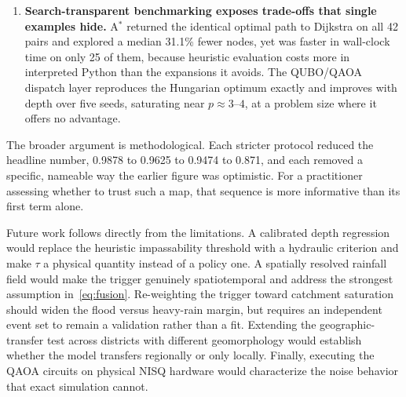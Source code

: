 \documentclass[10pt,twocolumn]{article}
\begin{document}
\begin{enumerate}
      pairs at $\tau\ge0.65$, $0.55$--$0.60$ and $\le0.50$. $\tau$ should be set
      by policy on acceptable risk, not by convention.
\item \textbf{Search-transparent benchmarking exposes trade-offs that single
      examples hide.} A$^\ast$ returned the identical optimal path to Dijkstra on
      all 42 pairs and explored a median 31.1\% fewer nodes, yet was faster in
      wall-clock time on only 25 of them, because heuristic evaluation costs more
      in interpreted Python than the expansions it avoids. The QUBO/QAOA dispatch
      layer reproduces the Hungarian optimum exactly and improves with depth
      over five seeds, saturating near $p\approx3$--$4$, at a problem size where
      it offers no advantage.
\end{enumerate}

The broader argument is methodological. Each stricter protocol reduced the
headline number, 0.9878 to 0.9625 to 0.9474 to 0.871, and each removed a specific,
nameable way the earlier figure was optimistic. For a practitioner assessing
whether to trust such a map, that sequence is more informative than its first term
alone.

Future work follows directly from the limitations. A calibrated depth regression
would replace the heuristic impassability threshold with a hydraulic criterion
and make $\tau$ a physical quantity instead of a policy one. A spatially
resolved rainfall field would make the trigger genuinely spatiotemporal and
address the strongest assumption in~\eqref{eq:fusion}. Re-weighting the
trigger toward catchment saturation should widen the flood versus heavy-rain
margin, but requires an independent event set to remain a validation rather than
a fit. Extending the geographic-transfer test across districts with different
geomorphology would establish whether the model transfers regionally or only
locally. Finally, executing the QAOA circuits on physical NISQ hardware would
characterize the noise behavior that exact simulation cannot.


\footnotesize
\end{document}

